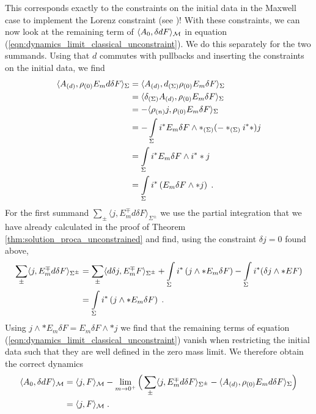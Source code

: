 This corresponds exactly to the constraints on the initial data in the Maxwell case to implement the Lorenz constraint (see \cite[Theorem 2.11]{pfenning})! With these constraints, we can now look at the remaining term of $\langle A_0 , \delta d F\rangle_{\mathcal{M}}$ in equation (\ref{eqn:dynamics_limit_classical_unconstraint}). We do this separately for the two summands. Using that $d$ commutes with pullbacks and inserting the constraints on the initial data, we find
\begin{align}
\langle {A_{(d)}} , \rho_{(0)} E_m d\delta  F \rangle_\Sigma
	&= \langle {A_{(d)}} , d_{(\Sigma)} \rho_{(0)} E_m \delta  F \rangle_\Sigma \notag\\
    &=	\langle \delta_{(\Sigma)}{A_{(d)}} ,  \rho_{(0)} E_m \delta  F \rangle_\Sigma \notag\\
    &= -\langle \rho_{(n)} j ,  \rho_{(0)} E_m \delta  F \rangle_\Sigma \notag\\
    &= -\int\limits_{\Sigma} i^* E_m \delta F \wedge *_{(\Sigma)} (- *_{(\Sigma)}  i^* *)j \notag\\
    &=  \int\limits_{\Sigma} i^* E_m \delta F \wedge i^* * j \notag\\
    &=  \int\limits_{\Sigma} i^*\left(  E_m \delta F \wedge * j \right) \;.
\end{align}
For the first summand $\sum_\pm \langle j ,  E_m^\mp d\delta F   \rangle_{\Sigma^\pm}$ we use the partial integration that we have already calculated in the proof of Theorem \ref{thm:solution_proca_unconstrained} and find, using the constraint $\delta j = 0$ found above,
\begin{align}
\sum_\pm \langle j ,  E_m^\mp d\delta F   \rangle_{\Sigma^\pm}
&= \sum_\pm \langle d \delta j ,  E_m^\mp  F   \rangle_{\Sigma^\pm} + \int\limits_{\Sigma} i^*\left(  j \wedge * E_m \delta F \right) -  \int\limits_\Sigma i^*(\delta j \wedge *EF ) \notag\\
&= \int\limits_{\Sigma} i^*\left(  j \wedge * E_m \delta F \right)   \;.
\end{align}
Using $j \wedge * E_m \delta F = E_m \delta F \wedge * j$ we find that the remaining terms of equation (\ref{eqn:dynamics_limit_classical_unconstraint}) vanish when restricting the initial data such that they are well defined in the zero mass limit. We therefore obtain the correct dynamics
\begin{align}
\langle A_0 , \delta d F \rangle_{\mathcal{M}}
&=  \langle j , F \rangle_{\mathcal{M}} - \lim\limits_{m \to 0^+}\Big(\sum\limits_\pm \langle j ,  E_m^\mp d\delta F   \rangle_{\Sigma^\pm}
		- \langle {A_{(d)}} , \rho_{(0)} E_m d\delta  F \rangle_\Sigma \Big) \notag\\
&= \langle j , F \rangle_{\mathcal{M}} \;.
\end{align}
